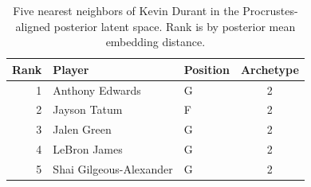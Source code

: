 \begin{table}[htbp]
  \centering\small
  \begin{tabular}{rllc}
    \toprule
    Rank & Player & Position & Archetype \\
    \midrule
    1 & Anthony Edwards & G & 2 \\
    2 & Jayson Tatum & F & 2 \\
    3 & Jalen Green & G & 2 \\
    4 & LeBron James & G & 2 \\
    5 & Shai Gilgeous-Alexander & G & 2 \\
    \bottomrule
  \end{tabular}
  \caption{Five nearest neighbors of Kevin Durant in the Procrustes-aligned posterior latent space. Rank is by posterior mean embedding distance.}
  \label{tab:Kevin_Durant_neighbors}
\end{table}

